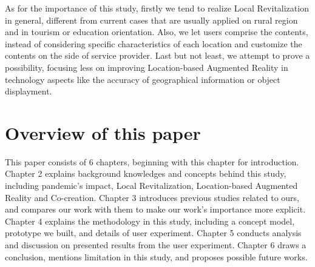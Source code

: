 
As for the importance of this study, firstly we tend to realize Local Revitalization in general, different from current cases that are usually applied on rural region and in tourism or education orientation.
Also, we let users comprise the contents, instead of considering specific characteristics of each location and customize the contents on the side of service provider.
Last but not least, we attempt to prove a possibility, focusing less on improving Location-based Augmented Reality in technology aspects like the accuracy of geographical information or object displayment.

\section{Overview of this paper}
This paper consists of 6 chapters, beginning with this chapter for introduction.
Chapter 2 explains background knowledges and concepts behind this study, including pandemic's impact, Local Revitalization, Location-based Augmented Reality and Co-creation.
Chapter 3 introduces previous studies related to ours, and compares our work with them to make our work's importance more explicit.
Chapter 4 explains the methodology in this study, including a concept model, prototype we built, and details of user experiment.
Chapter 5 conducts analysis and discussion on presented results from the user experiment.
Chapter 6 draws a conclusion, mentions limitation in this study, and proposes possible future works.
